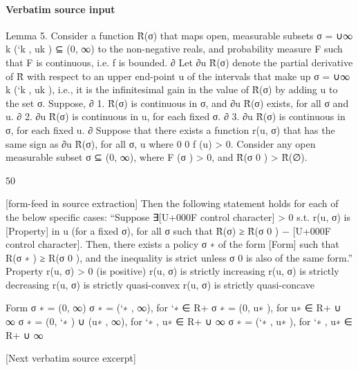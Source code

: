 \documentclass[10pt]{article}
\begin{document}
\paragraph{Verbatim source input}
\begin{ReviewVerbatim}
Lemma 5. Consider a function R̂(σ) that maps open, measurable subsets σ = ∪∞
k (`k , uk ) ⊆ (0, ∞)
to the non-negative reals, and probability measure F such that F is continuous, i.e. f is bounded.
∂
Let ∂u
R̂(σ) denote the partial derivative of R̂ with respect to an upper end-point u of the intervals
that make up σ = ∪∞
k (`k , uk ), i.e., it is the infinitesimal gain in the value of R̂(σ) by adding u to
the set σ. Suppose,
∂
1. R̂(σ) is continuous in σ, and ∂u
R̂(σ) exists, for all σ and u.
∂
2. ∂u
R̂(σ) is continuous in u, for each fixed σ.
∂
3. ∂u
R̂(σ) is continuous in σ, for each fixed u.
∂
Suppose that there exists a function r(u, σ) that has the same sign as ∂u
R̂(σ), for all σ, u where
0
0
f (u) > 0. Consider any open measurable subset σ ⊆ (0, ∞), where F (σ ) > 0, and R̂(σ 0 ) > R̂(∅).

50


[form-feed in source extraction]
Then the following statement holds for each of the below specific cases: “Suppose ∃[U+000F control character] > 0 s.t.
r(u, σ) is [Property] in u (for a fixed σ), for all σ such that R̂(σ) ≥ R̂(σ 0 ) − [U+000F control character]. Then, there exists
a policy σ ∗ of the form [Form] such that R(σ ∗ ) ≥ R(σ 0 ), and the inequality is strict unless σ 0 is
also of the same form.”
Property
r(u, σ) > 0 (is positive)
r(u, σ) is strictly increasing
r(u, σ) is strictly decreasing
r(u, σ) is strictly quasi-convex
r(u, σ) is strictly quasi-concave

Form
σ ∗ = (0, ∞)
σ ∗ = (`∗ , ∞), for `∗ ∈ R+
σ ∗ = (0, u∗ ), for u∗ ∈ R+ ∪ {∞}
σ ∗ = (0, `∗ ) ∪ (u∗ , ∞), for `∗ , u∗ ∈ R+ ∪ {∞}
σ ∗ = (`∗ , u∗ ), for `∗ , u∗ ∈ R+ ∪ {∞}

[Next verbatim source excerpt]



\end{ReviewVerbatim}
\end{document}
